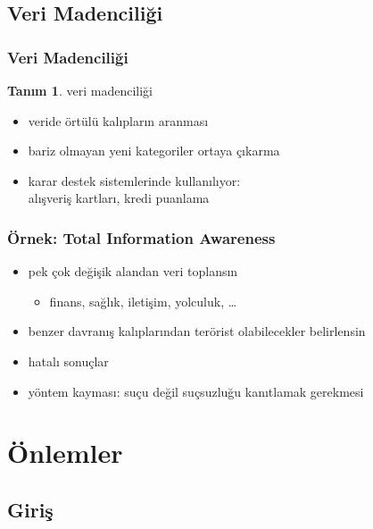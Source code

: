 \documentclass[dvipsnames]{beamer}
\theoremstyle{definition}
\newtheorem{tanim}[theorem]{Tanım}
\theoremstyle{example}
\theoremstyle{plain}
\begin{document}
\subsection{Veri Madenciliği}

\begin{frame}
  \frametitle{Veri Madenciliği}

  \begin{tanim}
    \alert{veri madenciliği}

    \begin{itemize}
      \item veride örtülü kalıpların aranması
      \item bariz olmayan yeni kategoriler ortaya çıkarma
    \end{itemize}
  \end{tanim}

  \pause
  \begin{itemize}
    \item karar destek sistemlerinde kullanılıyor:\\
      alışveriş kartları, kredi puanlama
  \end{itemize}
\end{frame}

\begin{frame}
  \frametitle{Örnek: Total Information Awareness}

  \begin{itemize}
    \item pek çok değişik alandan veri toplansın
    \begin{itemize}
      \item finans, sağlık, iletişim, yolculuk, \ldots
    \end{itemize}
    \item benzer davranış kalıplarından terörist olabilecekler belirlensin

    \pause
    \bigskip
    \item hatalı sonuçlar
    \item yöntem kayması: suçu değil suçsuzluğu kanıtlamak gerekmesi
  \end{itemize}
\end{frame}

\section{Önlemler}

\subsection{Giriş}
\end{document}
